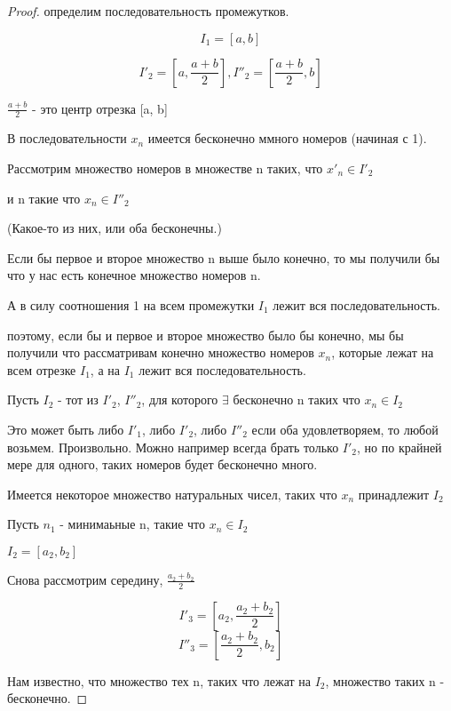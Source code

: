 \begin{proof}
    определим последовательность промежутков.

    \[ I_1 = [a, b] \]

    \[ I'_2 = [a, \frac{a + b}{2}],  I''_2=[\frac{a+b}{2}, b]\]

    \begin{note}
        $\frac{a + b}{2}$ - это центр отрезка [a, b]
    \end{note}

    В последовательности $x_n$ имеется бесконечно ммного номеров (начиная с 1).

    Рассмотрим множество номеров в множестве n таких, что $x'_n \in I'_2$

    и n такие что $x_n \in I''_2$

    (Какое-то из них, или оба бесконечны.)

    Если бы первое и второе множество n выше было конечно, то мы получили бы что у нас есть конечное множество номеров n.

    А в силу соотношения 1 на всем промежутки $I_1$ лежит вся последовательность.

    поэтому, если бы и первое и второе множество было бы конечно, мы бы получили что рассматривам конечно множество номеров $x_n$, которые лежат на всем отрезке $I_1$, а на $I_1$ лежит вся последовательность.


    Пусть $I_2$ - тот из $I'_2$, $I''_2$, для которого $\exists$ бесконечно n таких что $x_n \in I_2$

    \begin{note}
        Это может быть либо $I'_1$, либо $I'_2$, либо $I''_2$ если оба удовлетворяем, то любой возьмем. Произвольно. Можно например всегда брать только $I'_2$, но по крайней мере для одного, таких номеров будет бесконечно много.
    \end{note}

    Имеется некоторое множество натуральных чисел, таких что $x_n$ принадлежит $I_2$

    Пусть $n_1$ - минимаьные n, такие что $x_n \in I_2$

    $I_2 = [a_2, b_2]$

    \begin{note}
        Снова рассмотрим середину, $\frac{a_2 + b_2}{2}$
    \end{note}

    \[I'_3 = [a_2, \frac{a_2+b_2}{2}] \]
    \[I''_3 = [\frac{a_2 + b_2}{2}, b_2] \]

    Нам известно, что множество тех n, таких что лежат на $I_2$, множество таких n - бесконечно.


\end{proof}
